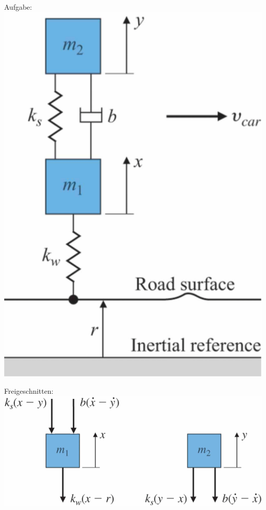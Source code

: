 \begin{tcolorbox}[colback=white!10!white,
                  colframe=gray!50!black,
                  title=Beispiel]
    \begin{minipage}{0.3\textwidth}
        Aufgabe:
        \centering
        \includegraphics[width=\textwidth]{images/free_body_diag_example1_a}
    \end{minipage}
    \begin{minipage}{0.65\textwidth}
        Freigeschnitten:
        \centering
        \includegraphics[width=\textwidth]{images/free_body_diag_example1_b}

\end{minipage}
\end{tcolorbox}
